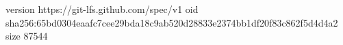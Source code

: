 version https://git-lfs.github.com/spec/v1
oid sha256:65bd0304eaafc7cee29bda18c9ab520d28833e2374bb1df20f83c862f5d4d4a2
size 87544
